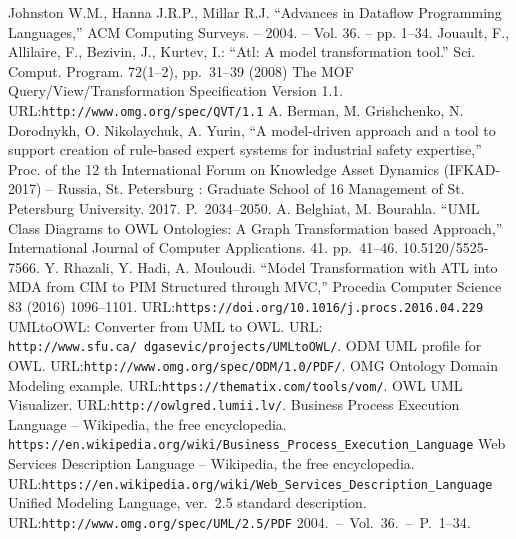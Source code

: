 \documentclass[conference,a4paper]{IEEEtran}
\providecommand\url[1]{\texttt{#1}}
\begin{document}
\begin{thebibliography}{11}
 Johnston W.M., Hanna J.R.P., Millar R.J. ``Advances in Dataflow Programming Languages,''
  ACM Computing Surveys. -- 2004. -- Vol. 36. -- pp. 1--34.
 Jouault, F., Allilaire, F., Bezivin, J., Kurtev, I.: ``Atl: A model transformation tool.'' Sci. Comput. Program. 72(1--2), pp.~31--39 (2008)
 The MOF Query/View/Transformation Specification Version 1.1. URL:\url{http://www.omg.org/spec/QVT/1.1}
 A. Berman, M. Grishchenko, N. Dorodnykh, O. Nikolaychuk, A. Yurin, ``A model-driven approach and a tool to support creation of rule-based expert systems for industrial safety expertise,'' Proc. of the 12 th International Forum on Knowledge Asset Dynamics (IFKAD-2017) -- Russia, St. Petersburg : Graduate School of 16 Management of St. Petersburg University.  2017.  P.~2034--2050.
 A. Belghiat, M. Bourahla. ``UML Class Diagrams to OWL Ontologies: A Graph Transformation based Approach,'' International Journal of Computer Applications. 41. pp.~41--46. 10.5120/5525-7566.
Y. Rhazali, Y. Hadi, A. Mouloudi. ``Model Transformation with ATL into MDA from CIM to PIM Structured through MVC,'' Procedia Computer Science 83 (2016) 1096–1101. URL:\url{https://doi.org/10.1016/j.procs.2016.04.229}
 UMLtoOWL: Converter from UML to OWL. URL: \url{http://www.sfu.ca/~dgasevic/projects/UMLtoOWL/}.
 ODM UML profile for OWL. URL:\url{http://www.omg.org/spec/ODM/1.0/PDF/}.
 OMG Ontology Domain Modeling example. URL:\url{https://thematix.com/tools/vom/}.
 OWL UML Visualizer. URL:\url{http://owlgred.lumii.lv/}.
 Business Process Execution Language -- Wikipedia, the free encyclopedia. \url{https://en.wikipedia.org/wiki/Business_Process_Execution_Language}
 Web Services Description Language -- Wikipedia, the free encyclopedia.  URL:\url{https://en.wikipedia.org/wiki/Web_Services_Description_Language}
 Unified Modeling Language, ver.~2.5 standard description. URL:\url{http://www.omg.org/spec/UML/2.5/PDF}
  2004.~--~Vol.~36.~--~P.~1--34.
\end{thebibliography}




\end{document}
